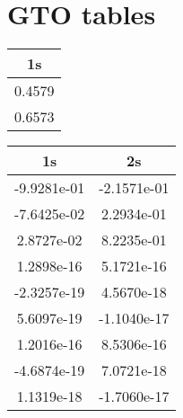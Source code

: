 	\section{GTO tables}
	\label{sec:GTO_app}
		\begin{table}
			\begin{centering}
			\begin{subtable}{1.0\linewidth}
				\begin{centering}
				\begin{tabular}{|c|}
					\hline 
					1s\tabularnewline
					\hline 
					0.4579\tabularnewline
					\hline 
					0.6573\tabularnewline
					\hline 
				\end{tabular}
				\par\end{centering}
			\end{subtable}

			\begin{subtable}{1.0\linewidth}
				\begin{centering}
				\begin{tabular}{|c|c|}
					\hline 
					1s & 2s\tabularnewline
					\hline 
					-9.9281e-01 & -2.1571e-01\tabularnewline
					\hline 
					-7.6425e-02 & 2.2934e-01\tabularnewline
					\hline 
					2.8727e-02 & 8.2235e-01\tabularnewline
					\hline 
					1.2898e-16 & 5.1721e-16\tabularnewline
					\hline 
					-2.3257e-19 & 4.5670e-18\tabularnewline
					\hline 
					5.6097e-19 & -1.1040e-17\tabularnewline
					\hline 
					1.2016e-16  & 8.5306e-16\tabularnewline
					\hline 
					-4.6874e-19 & 7.0721e-18\tabularnewline
					\hline 
					1.1319e-18 & -1.7060e-17\tabularnewline
					\hline 
				\end{tabular}
				\par\end{centering}
			\end{subtable}


\end{centering}
\end{table}
